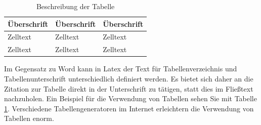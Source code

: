 \begin{table}[htbp]
\centering
\begin{tabular}{|p{}|p{}|p{}|}
\hline
\textbf{Überschrift} & \textbf{Überschrift} & \textbf{Überschrift} \\ \hline
Zelltext             & Zelltext             &   Zelltext             \\ \hline
Zelltext             & Zelltext             & Zelltext             \\ \hline
\end{tabular}
\caption[Beschreibung der Tabelle]{Beschreibung der Tabelle \parencite[1-2]{bergener_wissenschaftliches_2019}}
\label{tab:beispieltabelle}
\end{table}
Im Gegensatz zu Word kann in Latex der Text für Tabellenverzeichnis und Tabellenunterschrift unterschiedlich definiert werden. Es bietet sich daher an die Zitation zur Tabelle direkt in der Unterschrift zu tätigen, statt dies im Fließtext nachzuholen. Ein Beispiel für die Verwendung von Tabellen sehen Sie mit Tabelle \ref{tab:beispieltabelle}. Verschiedene Tabellengeneratoren im Internet erleichtern die Verwendung von Tabellen enorm.









